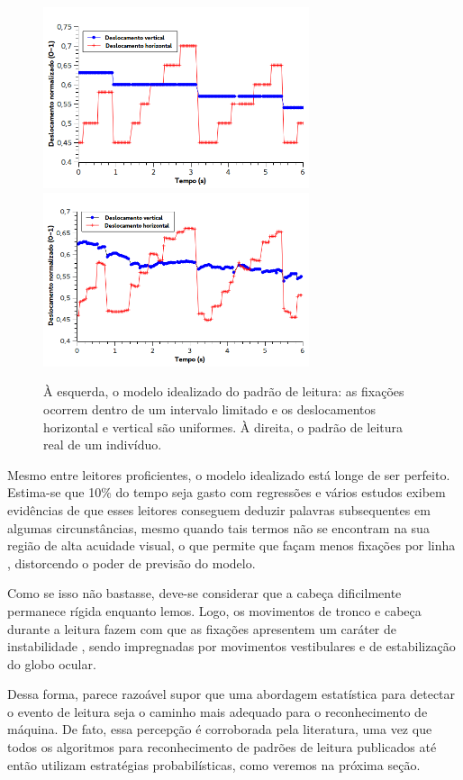 \documentclass[12pt]{article}
\begin{document}
		\begin{figure}[!ht]
			\centering
			\includegraphics[width=7.8cm]{imgs/idealizado_1.png}
			\includegraphics[width=7.8cm]{imgs/idealizado_2.png}
			\caption{\footnotesize {À esquerda, o modelo idealizado do padrão de leitura: as fixações ocorrem dentro de um intervalo limitado e os deslocamentos horizontal e vertical são uniformes. À direita, o padrão de leitura real de um indivíduo.}}
			\label{fig:idealizado}
			\vspace{5mm}
		\end{figure}

		Mesmo entre leitores proficientes, o modelo idealizado está longe de ser perfeito. Estima-se que 10\% do tempo seja gasto com regressões \cite{Reichle-1998} e vários estudos exibem evidências de que esses leitores conseguem deduzir palavras subsequentes em algumas circunstâncias, mesmo quando tais termos não se encontram na sua região de alta acuidade visual, o que permite que façam menos fixações por linha \cite{Rayner-2001}, distorcendo o poder de previsão do modelo.
		
		Como se isso não bastasse, deve-se considerar que a cabeça dificilmente permanece rígida enquanto lemos. Logo, os movimentos de tronco e cabeça durante a leitura fazem com que as fixações apresentem um caráter de instabilidade \cite{Lee-1999}, sendo impregnadas por movimentos vestibulares e de estabilização do globo ocular.
		
		Dessa forma, parece razoável supor que uma abordagem estatística para detectar o evento de leitura seja o caminho mais adequado para o reconhecimento de máquina. De fato, essa percepção é corroborada pela literatura, uma vez que todos os algoritmos para reconhecimento de padrões de leitura publicados até então utilizam estratégias probabilísticas, como veremos na próxima seção.
		\clearpage
		
\end{document}
